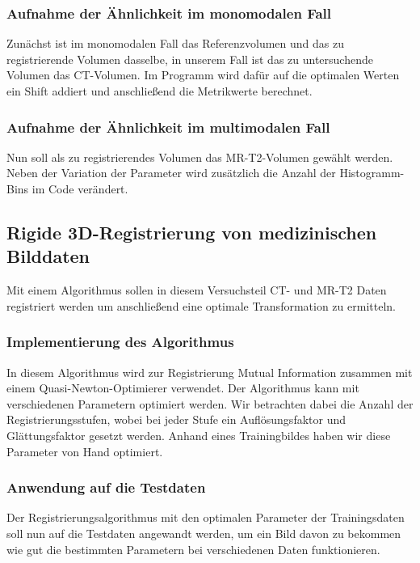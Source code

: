 \subsubsection{Aufnahme der Ähnlichkeit im monomodalen Fall}
Zunächst ist im monomodalen Fall das Referenzvolumen und das zu registrierende
Volumen dasselbe, in unserem Fall ist das zu untersuchende Volumen das
CT-Volumen. Im Programm wird dafür auf die optimalen Werten ein Shift addiert
und anschließend die Metrikwerte berechnet.

\subsubsection{Aufnahme der Ähnlichkeit im multimodalen Fall}
Nun soll als zu registrierendes Volumen das MR-T2-Volumen gewählt werden. Neben
der Variation der Parameter wird zusätzlich die Anzahl der Histogramm-Bins
im Code verändert.

\subsection{Rigide 3D-Registrierung von medizinischen Bilddaten}
Mit einem Algorithmus sollen in diesem Versuchsteil CT- und MR-T2 Daten
registriert werden um anschließend eine optimale Transformation zu ermitteln.

\subsubsection{Implementierung des Algorithmus}
In diesem Algorithmus wird zur Registrierung Mutual Information zusammen mit
einem Quasi-Newton-Optimierer verwendet. Der Algorithmus kann mit verschiedenen
Parametern optimiert werden. Wir betrachten dabei die Anzahl der
Registrierungsstufen, wobei bei jeder Stufe ein Auflösungsfaktor und
Glättungsfaktor gesetzt werden. Anhand eines Trainingbildes haben wir diese
Parameter von Hand optimiert.

\subsubsection{Anwendung auf die Testdaten}
Der Registrierungsalgorithmus mit den optimalen Parameter der Trainingsdaten
soll nun auf die Testdaten angewandt werden, um ein Bild davon zu bekommen wie
gut die bestimmten Parametern bei verschiedenen Daten funktionieren.

